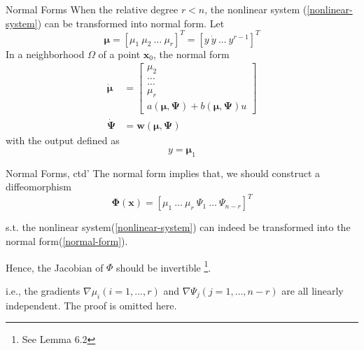 \documentclass{beamer}
\renewcommand{\vec}[1]{\ensuremath{\boldsymbol{#1}}} %
\begin{document}
\begin{frame}{Normal Forms}
    When the relative degree {\color{red}$r<n$}, the nonlinear system (\ref{nonlinear-system}) can be transformed into {\color{red}normal form}. Let
    \begin{equation}\label{translate-state}
      \vec{\mu}=\left[\mu_{1}~\mu_{2}~\dots~\mu_{r}\right]^{T}=\left[y~\dot{y}~\dots~y^{r-1} \right]^{T}
    \end{equation}
    In a neighborhood $\Omega$ of a point $\vec{x}_{0}$, the normal form
    \begin{equation}\label{normal-form}
    \begin{aligned}
      \dot{\vec{\mu}} &= \left[\begin{matrix}
                                \mu_{2} \\
                                \dots \\
                                \dots \\
                                \mu_{r} \\
                                a(\vec{\mu}, \vec{\Psi})+b(\vec{\mu}, \vec{\Psi})u
                              \end{matrix}\right] \\
      \dot{\vec{\Psi}} &= \vec{w}(\vec{\mu}, \vec{\Psi})
    \end{aligned}
    \end{equation}
    with the output defined as
    \begin{equation}\label{normal-form-output}
      y=\vec{\mu}_{1}
    \end{equation}
\end{frame}


\begin{frame}{Normal Forms, ctd'}
    The normal form implies that, we should construct a {\color{red}diffeomorphism}
    \begin{equation}\label{diffeomorphism}
      \vec{\Phi}(\vec{x}) = \left[ \mu_{1}~\dots~\mu_{r}~\Psi_{1}~\dots~\Psi_{n-r} \right]^{T}
    \end{equation}

    s.t. the nonlinear system(\ref{nonlinear-system}) can indeed be transformed into the normal form(\ref{normal-form}).

    Hence, the Jacobian of $\Phi$ should be invertible \footnote{See Lemma 6.2}.

    i.e., the gradients $\nabla \mu_{i}(i=1, \dots, r)$ and $\nabla \Psi_{j}(j=1, \dots, n-r)$ are all linearly independent. The proof is omitted here.
\end{frame}
\end{document}
